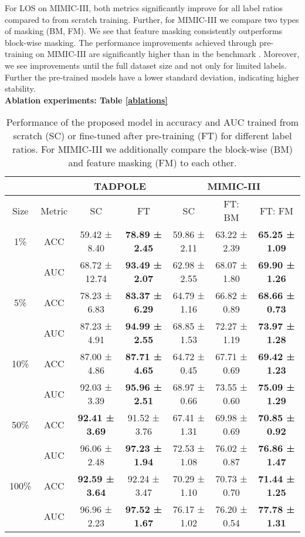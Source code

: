 \documentclass[runningheads]{llncs}
\begin{document}
For LOS on MIMIC-III, both metrics significantly improve for all label ratios compared to from scratch training. Further, for MIMIC-III we compare two types of masking (BM, FM). We see that feature masking consistently outperforms block-wise masking. The performance improvements achieved through pre-training on MIMIC-III are significantly higher than in the benchmark \cite{mcdermott2021EHRbenchmark}. Moreover, we see improvements until the full dataset size and not only for limited labels. Further the pre-trained models have a lower standard deviation, indicating higher stability.\\
\textbf{Ablation experiments: Table \ref{ablations}}
\begin{table}[htb!]
  \caption{Performance of the proposed model in accuracy and AUC trained from scratch (SC) or fine-tuned after pre-training (FT) for different label ratios. For MIMIC-III we additionally compare the block-wise (BM) and feature masking (FM) to each other.}
    \begin{tabular}{c|c|c|c|c|c|c}
        \toprule
         & & \multicolumn{2}{c|}{TADPOLE} & \multicolumn{3}{|c}{MIMIC-III} \\
        \midrule
        Size & Metric & SC & FT & SC & FT: BM & FT: FM \\
        \midrule
        1\% & ACC & 59.42 ± 8.40 & \textbf{78.89 ± 2.45} & 59.86 ± 2.11 & \color{blue}63.22 ± 2.39 & \textbf{65.25 ± 1.09}\\
        & AUC & 68.72 ± 12.74 & \textbf{93.49 ± 2.07} & 62.98 ± 2.55 & \color{blue}68.07 ± 1.80 & \textbf{69.90 ± 1.26}\\
        \midrule
        5\% & ACC & 78.23 ± 6.83 & \textbf{83.37 ± 6.29} & 64.79 ± 1.16 & \color{blue}66.82 ± 0.89 & \textbf{68.66 ± 0.73}\\
        & AUC & 87.23 ± 4.91 & \textbf{94.99 ± 2.55} & 68.85 ± 1.53 & \color{blue}72.27 ± 1.19 & \textbf{73.97 ± 1.28}\\
        \midrule
        10\% & ACC & 87.00 ± 4.86 & \textbf{87.71 ± 4.65} & 64.72 ± 0.45 & \color{blue}67.71 ± 0.69 & \textbf{69.42 ± 1.23}\\
        & AUC & 92.03 ± 3.39 & \textbf{95.96 ± 2.51} & 68.97 ± 0.66 & \color{blue}73.55 ± 0.60 & \textbf{75.09 ± 1.29}\\
        \midrule
        50\% & ACC & \textbf{92.41 ± 3.69} & 91.52 ± 3.76 & 67.41 ± 1.31 & \color{blue}69.98 ± 0.69 & \textbf{70.85 ± 0.92}\\
        & AUC & 96.06 ± 2.48 & \textbf{97.23 ± 1.94} & 72.53 ± 1.08 & \color{blue}76.02 ± 0.87 & \textbf{76.86 ± 1.47}\\
        \midrule
        100\% & ACC & \textbf{92.59 ± 3.64} & 92.24 ± 3.47 & 70.29 ± 1.10 & \color{blue}70.73 ± 0.70 & \textbf{71.44 ± 1.25}\\
        & AUC & 96.96 ± 2.23 & \textbf{97.52 ± 1.67} & 76.17 ± 1.02 & \color{blue}76.20 ± 0.54 & \textbf{77.78 ± 1.31}\\
        \bottomrule
    \end{tabular}
    \label{results_table}
\end{table}
\end{document}

